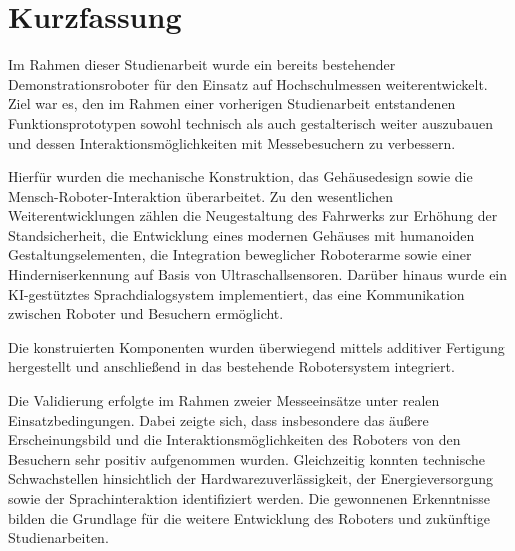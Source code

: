 \chapter*{Kurzfassung}

Im Rahmen dieser Studienarbeit wurde ein bereits bestehender Demonstrationsroboter für den Einsatz auf Hochschulmessen weiterentwickelt. Ziel war es, den im Rahmen einer vorherigen Studienarbeit entstandenen Funktionsprototypen sowohl technisch als auch gestalterisch weiter auszubauen und dessen Interaktionsmöglichkeiten mit Messebesuchern zu verbessern.

Hierfür wurden die mechanische Konstruktion, das Gehäusedesign sowie die Mensch-Roboter-Interaktion überarbeitet. Zu den wesentlichen Weiterentwicklungen zählen die Neugestaltung des Fahrwerks zur Erhöhung der Standsicherheit, die Entwicklung eines modernen Gehäuses mit humanoiden Gestaltungselementen, die Integration beweglicher Roboterarme sowie einer Hinderniserkennung auf Basis von Ultraschallsensoren. Darüber hinaus wurde ein KI-gestütztes Sprachdialogsystem implementiert, das eine Kommunikation zwischen Roboter und Besuchern ermöglicht.

Die konstruierten Komponenten wurden überwiegend mittels additiver Fertigung hergestellt und anschließend in das bestehende Robotersystem integriert.

Die Validierung erfolgte im Rahmen zweier Messeeinsätze unter realen Einsatzbedingungen. Dabei zeigte sich, dass insbesondere das äußere Erscheinungsbild und die Interaktionsmöglichkeiten des Roboters von den Besuchern sehr positiv aufgenommen wurden. Gleichzeitig konnten technische Schwachstellen hinsichtlich der Hardwarezuverlässigkeit, der Energieversorgung sowie der Sprachinteraktion identifiziert werden. Die gewonnenen Erkenntnisse bilden die Grundlage für die weitere Entwicklung des Roboters und zukünftige Studienarbeiten.

\clearpage